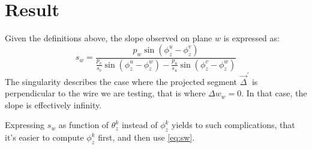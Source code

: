 \documentclass{article}
\DeclareRobustCommand{\brackets}[1]{\ensuremath{\left(#1\right)}}
\begin{document}
	
	\section{Result}
	\label{sec:Result}
	
	Given the definitions above, the slope observed on plane $w$ is expressed as:
	\begin{equation}
		s_{w} = \frac{p_{w} \sin \brackets{\phi_{z}^{u} - \phi_{z}^{v}}}
		      {\frac{p_{v} }{s_{v}} \sin \brackets{\phi_{z}^{u} - \phi_{z}^{w}} - \frac{p_{u}}{s_{u}} \sin \brackets{\phi_{z}^{v} - \phi_{z}^{w}}}
		\label{eq:sw}
	\end{equation}
	The singularity describes the case where the projected segment $\vec{\Delta}^{\prime}$ is perpendicular to the wire we are testing, that is where $\Delta w_{w} = 0$.
	In that case, the slope is effectively infinity.
	
	Expressing $s_{w}$ as function of $\theta_{z}^{k}$ instead of $\phi_{z}^{k}$ yields to such complications,
	that it's easier to compute $\phi_{z}^{k}$ first, and then use \cref{eq:sw}.
	
\end{document}
